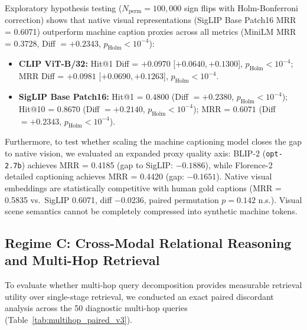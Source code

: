 \documentclass[conference]{IEEEtran}
\begin{document}
Exploratory hypothesis testing ($N_{\text{perm}}=100{,}000$ sign flips with Holm-Bonferroni correction) shows that native visual representations (SigLIP Base Patch16 MRR = 0.6071) outperform machine caption proxies across all metrics (MiniLM MRR = 0.3728, Diff $= +0.2343$, $p_{\text{Holm}} < 10^{-4}$):
\begin{itemize}
    \setlength{\itemsep}{0.2pt plus 0.1pt}
    \setlength{\parskip}{0pt}
    \item \textbf{CLIP ViT-B/32:} Hit@1 Diff = $+0.0970$ [$+0.0640, +0.1300$], $p_{\text{Holm}} < 10^{-4}$; MRR Diff = $+0.0981$ [$+0.0690, +0.1263$], $p_{\text{Holm}} < 10^{-4}$.
    \item \textbf{SigLIP Base Patch16:} Hit@1 = $0.4800$ (Diff $= +0.2380$, $p_{\text{Holm}} < 10^{-4}$); Hit@10 = $0.8670$ (Diff $= +0.2140$, $p_{\text{Holm}} < 10^{-4}$); MRR = $0.6071$ (Diff $= +0.2343$, $p_{\text{Holm}} < 10^{-4}$).
\end{itemize}

Furthermore, to test whether scaling the machine captioning model closes the gap to native vision, we evaluated an expanded proxy quality axis: BLIP-2 (\texttt{opt-2.7b}) \cite{li2023blip2} achieves MRR = 0.4185 (gap to SigLIP: $-0.1886$), while Florence-2 detailed captioning \cite{xiao2024florence2} achieves MRR = 0.4420 (gap: $-0.1651$). Native visual embeddings are statistically competitive with human gold captions (MRR = 0.5835 vs.\ SigLIP 0.6071, diff $-0.0236$, paired permutation $p = 0.142$ n.s.). Visual scene semantics cannot be completely compressed into synthetic machine tokens.

\subsection{Regime C: Cross-Modal Relational Reasoning and Multi-Hop Retrieval}
\label{sec:regime_c_multihop}
\label{sec:multihop_eval}

To evaluate whether multi-hop query decomposition provides measurable retrieval utility over single-stage retrieval, we conducted an exact paired discordant analysis across the 50 diagnostic multi-hop queries (Table~\ref{tab:multihop_paired_v3}).
\end{document}
